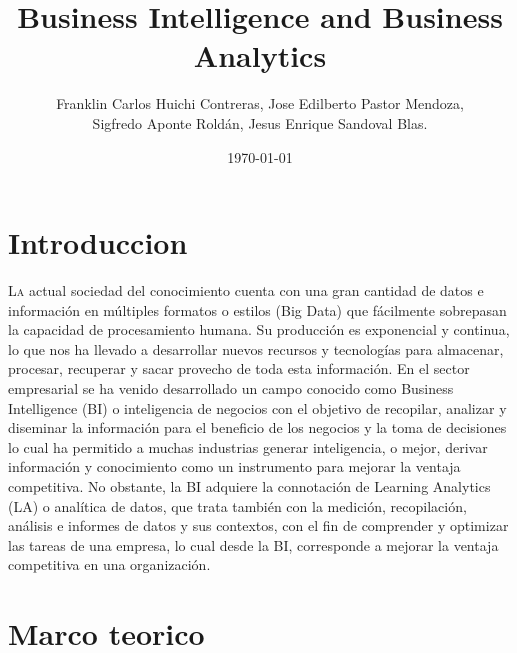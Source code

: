 \documentclass[twoside,twocolumn]{article}
\title{Business Intelligence and Business Analytics}
\author{Franklin Carlos Huichi Contreras, Jose Edilberto Pastor Mendoza, \\
Sigfredo Aponte Roldán, Jesus Enrique Sandoval Blas. }
\date{\today}
\begin{document}
\maketitle


\section{Introduccion}
\lettrine[nindent=0em,lines=3]{L}a actual sociedad del conocimiento cuenta con una gran cantidad de datos e información en múltiples formatos o estilos (Big Data) que fácilmente sobrepasan la capacidad de procesamiento humana. Su producción es exponencial y continua, lo que nos ha llevado a desarrollar nuevos recursos y tecnologías para almacenar, procesar, recuperar y sacar provecho de toda esta información. En el sector empresarial se ha venido desarrollado un campo conocido como Business Intelligence (BI) o inteligencia de negocios con el objetivo de recopilar, analizar y diseminar la información para el beneficio de los negocios y la toma de decisiones
lo cual ha permitido a muchas industrias generar inteligencia, o mejor, derivar información y conocimiento como un instrumento para
mejorar la ventaja competitiva.  No obstante, la BI adquiere la connotación de Learning Analytics (LA) o analítica de datos, que trata también con la medición, recopilación, análisis e informes de datos y sus contextos, con el fin de comprender y optimizar las tareas de una empresa, lo cual desde la BI, corresponde a mejorar la ventaja competitiva en una organización.



\section{Marco teorico}
\end{document}
